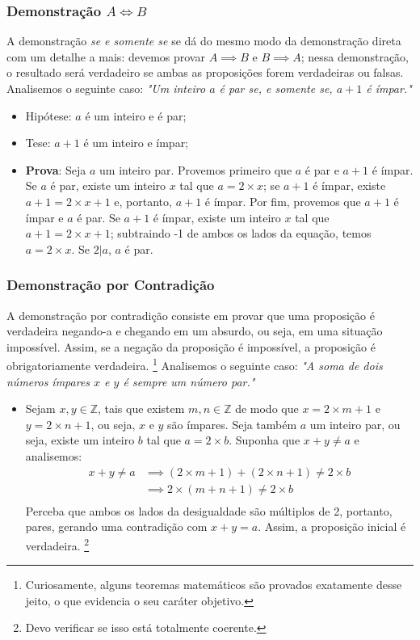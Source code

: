 \documentclass{article}
\begin{document}
\subsubsection{Demonstração $A \iff B$}
A demonstração \emph{se e somente se} se dá do mesmo modo da demonstração direta com um detalhe a mais: devemos provar $A \implies B$ e $B \implies A$; nessa demonstração, o resultado será verdadeiro se ambas as proposições forem verdadeiras ou falsas.
Analisemos o seguinte caso: \emph{"Um inteiro $a$ é par se, e somente se, $a + 1$ é ímpar."}
\begin{itemize}
    \item Hipótese: $a$ é um inteiro e é par;
    \item Tese: $a + 1$ é um inteiro e ímpar;
    \item \textbf{Prova}: Seja $a$ um inteiro par. Provemos primeiro que $a$ é par e $a + 1$ é ímpar. Se $a$ é par, existe um inteiro $x$ tal que $a = 2 \times x$; se $a + 1$ é ímpar, existe $a + 1 = 2 \times x + 1$ e, portanto, $a + 1$ é ímpar.
    Por fim, provemos que $a + 1$ é ímpar e $a$ é par.
    Se $a + 1$ é ímpar, existe um inteiro $x$ tal que $a + 1 = 2 \times x + 1$; subtraindo -1 de ambos os lados da equação, temos $a = 2 \times x$. Se $2|a$, $a$ é par.
    
\end{itemize}

\subsubsection{Demonstração por Contradição}
A demonstração por contradição consiste em provar que uma proposição é verdadeira negando-a e chegando em um absurdo, ou seja, em uma situação impossível. Assim, se a negação da proposição é impossível, a proposição é obrigatoriamente verdadeira. \footnote{Curiosamente, alguns teoremas matemáticos são provados exatamente desse jeito, o que evidencia o seu caráter objetivo.}
Analisemos o seguinte caso: \emph{"A soma de dois números ímpares $x$ e $y$ é sempre um número par."}
\begin{itemize}
    \item Sejam $x, y \in \mathbb{Z}$, tais que existem $m, n \in \mathbb{Z}$ de modo que $x = 2 \times m + 1$ e $y = 2 \times n + 1$, ou seja, $x$ e $y$ são ímpares. Seja também $a$ um inteiro par, ou seja, existe um inteiro $b$ tal que $a = 2 \times b$. Suponha que $x + y \ne a$ e analisemos:
    \begin{align*}
        x + y \ne a &\implies
        (2 \times m + 1) + (2 \times n + 1) \ne 2 \times b \\ &\implies
        2 \times (m + n + 1) \ne 2 \times b \\
    \end{align*}
    Perceba que ambos os lados da desigualdade são múltiplos de 2, portanto, pares, gerando uma contradição com $x + y = a$. Assim, a proposição inicial é verdadeira. \footnote{Devo verificar se isso está totalmente coerente.}
\end{itemize}
\end{document}

